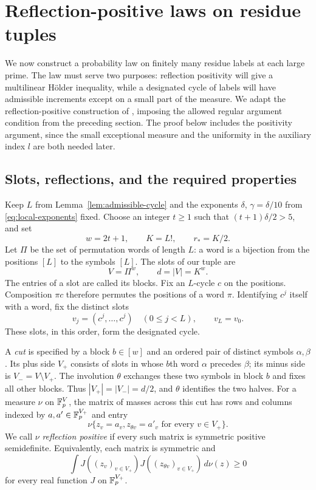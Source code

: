 \section{Reflection-positive laws on residue tuples}\label{sec:tuples}

We now construct a probability law on finitely many residue labels at each
large prime.  The law must serve two purposes: reflection positivity will
give a multilinear H\"older inequality, while a designated cycle of labels
will have admissible increments except on a small part of the measure.
We adapt the reflection-positive construction of
\cite[Section~3]{IntersectivePower}, imposing the allowed regular argument condition
from the preceding section.  The proof below includes the positivity
argument, since the small exceptional measure and the uniformity in the
auxiliary index $l$ are both needed later.

\subsection{Slots, reflections, and the required properties}

Keep $L$ from Lemma~\ref{lem:admissible-cycle} and the exponents
$\delta$, $\gamma=\delta/10$ from \eqref{eq:local-exponents} fixed.  Choose an integer
$t\ge1$ such that $(t+1)\delta/2>5$, and set
\[
 w=2t+1,\qquad K=L!,\qquad r_*=K/2.
\]
Let $\Pi$ be the set of permutation words of length $L$: a word is a
bijection from the positions $[L]$ to the symbols $[L]$.  The slots of our
tuple are
\[
 V=\Pi^w,\qquad d=|V|=K^w.
\]
The entries of a slot are called its blocks.  Fix an $L$-cycle $c$ on the
positions.  Composition $\pi c$ therefore permutes the positions of a
word $\pi$.  Identifying $c^j$ itself with a word, fix the distinct slots
\[
 v_j=(c^j,\ldots,c^j)\quad(0\le j<L),\qquad v_L=v_0.
\]
These slots, in this order, form the designated cycle.

A \emph{cut} is specified by a block $b\in[w]$ and an ordered pair of
distinct symbols $\alpha,\beta$.  Its plus side $V_+$ consists of slots
in whose $b$th word $\alpha$ precedes $\beta$; its minus side is
$V_-=V\setminus V_+$.  The involution $\theta$ exchanges these two
symbols in block $b$ and fixes all other blocks.  Thus
$|V_+|=|V_-|=d/2$, and $\theta$ identifies the two halves.
For a measure $\nu$ on $\mathbb F_p^V$, the matrix of masses across this
cut has rows and columns indexed by $a,a'\in\mathbb F_p^{V_+}$ and entry
\[
 \nu\{z_v=a_v, z_{\theta v}=a'_v\text{ for every }v\in V_+\}.
\]
We call $\nu$ \emph{reflection positive} if every such matrix is symmetric
positive semidefinite.  Equivalently, each matrix is symmetric and
\[
 \int J((z_v)_{v\in V_+})J((z_{\theta v})_{v\in V_+})\,d\nu(z)\ge0
\]
for every real function $J$ on $\mathbb F_p^{V_+}$.

